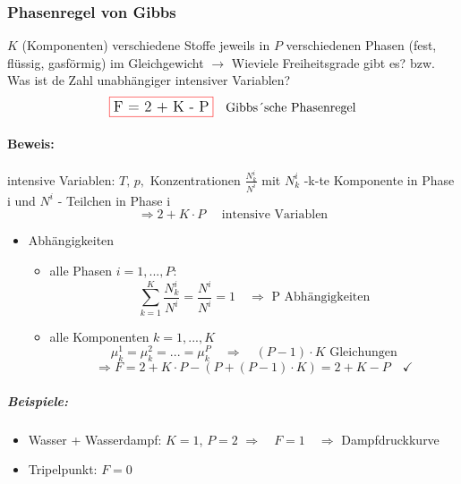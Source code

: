 \subsubsection{Phasenregel von Gibbs}
$K$ (Komponenten) verschiedene Stoffe jeweils in $P$ verschiedenen Phasen (fest, flüssig, gasförmig) im Gleichgewicht $\longrightarrow$ Wieviele Freiheitsgrade gibt es? bzw. Was ist de Zahl unabhängiger intensiver Variablen?
\begin{equation}
    \fcolorbox{red}{white}{\large F = 2 + K - P} \quad \text{Gibbs´sche Phasenregel}
\end{equation}

\paragraph{Beweis:} intensive Variablen: $T, \,p,$ Konzentrationen $\frac{N_k^i}{N^i}$ mit $N_k^i$ -k-te Komponente in Phase i und $N^i$ - Teilchen in Phase i
\begin{equation}
    \Longrightarrow 2 + K\cdot P \quad \text{ intensive Variablen}
\end{equation}
\begin{itemize}
    \item Abhängigkeiten
    \begin{itemize}
        \item alle Phasen $i = 1,...,P$:
        \begin{equation}
            \sum_{k=1}^K \frac{N_k^i}{N^i} = \frac{N^i}{N^i} = 1 \quad \Rightarrow \text{ P Abhängigkeiten}
        \end{equation}
        \item alle Komponenten $k = 1,...,K$
        \begin{equation}
            \mu_k^1 = \mu_k^2 = ... = \mu_k^P \quad \Rightarrow \quad (P-1) \cdot K \text{ Gleichungen}
        \end{equation}
        \begin{equation}
            \Rightarrow F = 2 + K\cdot P - (P + (P-1)\cdot K) = 2 + K - P \quad \checkmark
        \end{equation}
    \end{itemize}
\end{itemize}

\subparagraph{Beispiele:}
\begin{itemize}
    \item Wasser + Wasserdampf: $K=1$, $P=2$ $\Rightarrow \quad F=1 \quad \Rightarrow$ Dampfdruckkurve
    \item Tripelpunkt: $F=0$
\end{itemize}


